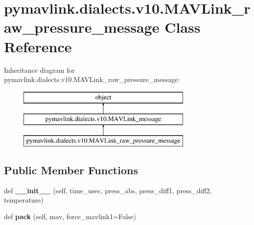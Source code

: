 \hypertarget{classpymavlink_1_1dialects_1_1v10_1_1MAVLink__raw__pressure__message}{}\section{pymavlink.\+dialects.\+v10.\+M\+A\+V\+Link\+\_\+raw\+\_\+pressure\+\_\+message Class Reference}
\label{classpymavlink_1_1dialects_1_1v10_1_1MAVLink__raw__pressure__message}
Inheritance diagram for pymavlink.\+dialects.\+v10.\+M\+A\+V\+Link\+\_\+raw\+\_\+pressure\+\_\+message\+:\begin{figure}[H]
\begin{center}
\leavevmode
\includegraphics[height=3.000000cm]{classpymavlink_1_1dialects_1_1v10_1_1MAVLink__raw__pressure__message}
\end{center}
\end{figure}
\subsection*{Public Member Functions}
\begin{DoxyCompactItemize}
\item 
\mbox{\label{classpymavlink_1_1dialects_1_1v10_1_1MAVLink__raw__pressure__message_a35b04dc06bdea58e07732c955a1dbcdb}} 
def {\bfseries \+\_\+\+\_\+init\+\_\+\+\_\+} (self, time\+\_\+usec, press\+\_\+abs, press\+\_\+diff1, press\+\_\+diff2, temperature)
\item 
\mbox{\label{classpymavlink_1_1dialects_1_1v10_1_1MAVLink__raw__pressure__message_a5ca93eff8f7cf3ed538a0304aca7ca8d}} 
def {\bfseries pack} (self, mav, force\+\_\+mavlink1=False)
\end{DoxyCompactItemize}
